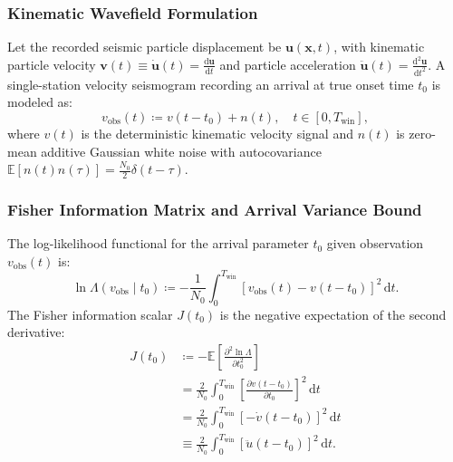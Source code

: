 \subsubsection*{Kinematic Wavefield Formulation}
Let the recorded seismic particle displacement be
$\mathbf{u}(\mathbf{x}, t)$, with kinematic
particle velocity $\mathbf{v}(t) \equiv \dot{\mathbf{u}}(t) =
\frac{\mathrm{d}\mathbf{u}}{\mathrm{d}t}$
and particle acceleration $\ddot{\mathbf{u}}(t) =
\frac{\mathrm{d}^2\mathbf{u}}{\mathrm{d}t^2}$.
A single-station velocity seismogram recording an arrival at true
onset time $t_0$ is modeled as:
\begin{equation}
  v_{\mathrm{obs}}(t) \coloneqq v(t - t_0) + n(t), \quad t \in [0,
  T_{\mathrm{win}}],
  \label{eq:supp_waveform_model}
\end{equation}
where $v(t)$ is the deterministic kinematic velocity signal and
$n(t)$ is zero-mean
additive Gaussian white noise with autocovariance
$\mathbb{E}[n(t)n(\tau)] = \frac{N_0}{2}\delta(t - \tau)$.

\subsubsection*{Fisher Information Matrix and Arrival Variance Bound}
The log-likelihood functional for the arrival parameter $t_0$ given
observation $v_{\mathrm{obs}}(t)$ is:
\begin{equation}
  \ln \Lambda(v_{\mathrm{obs}} \mid t_0) \coloneqq -\frac{1}{N_0}
  \int_0^{T_{\mathrm{win}}} \left[ v_{\mathrm{obs}}(t) - v(t - t_0)
  \right]^2 \,\mathrm{d}t.
  \label{eq:supp_log_likelihood}
\end{equation}
The Fisher information scalar $J(t_0)$ is the negative expectation
of the second derivative:
\begin{align}
  J(t_0)
  &\coloneqq -\mathbb{E}\left[ \frac{\partial^2 \ln
  \Lambda}{\partial t_0^2} \right]
  \label{eq:supp_fisher_def} \\
  &= \frac{2}{N_0} \int_0^{T_{\mathrm{win}}} \left[ \frac{\partial
  v(t - t_0)}{\partial t_0} \right]^2 \,\mathrm{d}t
  \label{eq:supp_fisher_deriv} \\
  &= \frac{2}{N_0} \int_0^{T_{\mathrm{win}}} \left[ -\dot{v}(t -
  t_0) \right]^2 \,\mathrm{d}t
  \label{eq:supp_fisher_dot_v} \\
  &\equiv \frac{2}{N_0} \int_0^{T_{\mathrm{win}}} \left[ \ddot{u}(t
  - t_0) \right]^2 \,\mathrm{d}t.
  \label{eq:supp_fisher_kinematic_accel}
\end{align}

